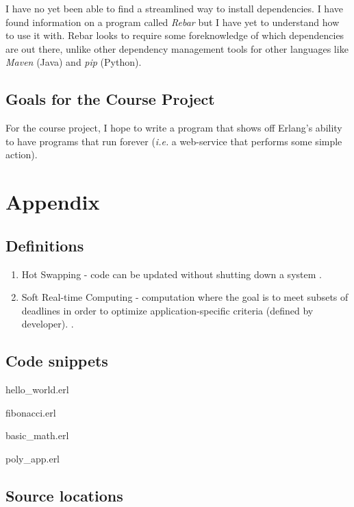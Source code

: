 \documentclass[11 pt]{IEEEtran}
\begin{document}
I have no yet been able to find a streamlined way to install dependencies. I have found information on a program called \emph{Rebar} but I have yet to understand how to use it with. Rebar looks to require some foreknowledge of which dependencies are out there, unlike other dependency management tools for other languages like \emph{Maven} (Java) and \emph{pip} (Python).

\subsection{Goals for the Course Project}
For the course project, I hope to write a program that shows off Erlang's ability to have programs that run forever (\emph{i.e.} a web-service that performs some simple action). 

\newpage
\section{Appendix}
\subsection{Definitions}\label{definitions}
\begin{enumerate}
\item  Hot Swapping - code can be updated without shutting down a system \cite{wiki}.
\item Soft Real-time Computing - computation where the goal is to meet subsets of deadlines in order to optimize application-specific criteria (defined by developer). \cite{soft-rt}.
\end{enumerate}
 
\subsection{Code snippets}

    hello\_world.erl
    
    
    fibonacci.erl
    
    
    basic\_math.erl
    

    
    poly\_app.erl
    
\subsection{Source locations}
\end{document}
